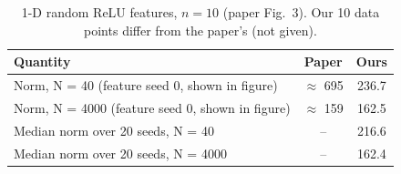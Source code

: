 \begin{table}[h]
  \centering
  \caption{1-D random ReLU features, $n = 10$ (paper Fig.~3). Our 10 data points differ from the paper's (not given).}
  \begin{tabular}{lcc}
    \toprule
    Quantity & Paper & Ours \\
    \midrule
    Norm, N = 40 (feature seed 0, shown in figure) & $\approx$ 695 & 236.7 \\
    Norm, N = 4000 (feature seed 0, shown in figure) & $\approx$ 159 & 162.5 \\
    Median norm over 20 seeds, N = 40 & -- & 216.6 \\
    Median norm over 20 seeds, N = 4000 & -- & 162.4 \\
    \bottomrule
  \end{tabular}
\end{table}
